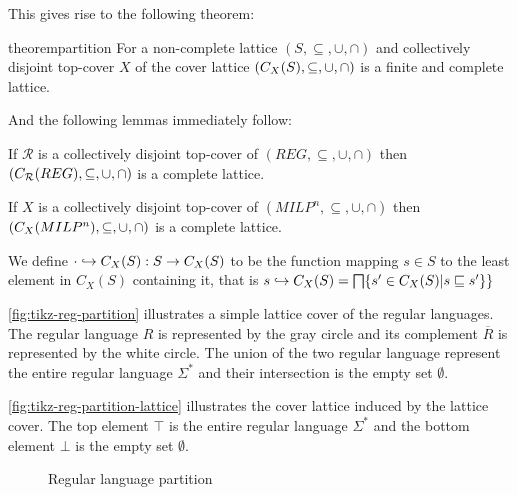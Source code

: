 This gives rise to the following theorem:

\begin{restatable}{theorem}{partition}\label{thm:partition}
    For a non-complete lattice $(S, \subseteq, \cup, \cap)$ and collectively disjoint top-cover $X$ of the cover lattice $(C_{X}(S), \subseteq, \cup, \cap)$ is a finite and complete lattice.
\end{restatable}

And the following lemmas immediately follow:

\begin{lemma}
    If $\mathcal{R}$ is a collectively disjoint top-cover of $(REG, \subseteq, \cup, \cap)$ then $(C_{\mathcal{R}}(REG), \subseteq, \cup, \cap)$ is a complete lattice.
\end{lemma}

\begin{lemma}
    If $X$ is a collectively disjoint top-cover of $(MILP^n, \subseteq, \cup, \cap)$ then $(C_{X}(MILP^n), \subseteq, \cup, \cap)$ is a complete lattice.
\end{lemma}

\begin{definition}
    We define $\cdot \hookrightarrow C_X(S):S\rightarrow C_X(S)$ to be the function mapping $s\in S$ to the least element in $C_X(S)$ containing it, that is $s \intoset C_X(S)=\bigsqcap\{s'\in C_X(S)|s\sqsubseteq s'\}\}$
\end{definition}

\begin{example}
    \autoref{fig:tikz-reg-partition} illustrates a simple lattice cover of the regular languages. The regular language $R$ is represented by the gray circle and its complement $\overline{R}$ is represented by the white circle. The union of the two regular language represent the entire regular language $\Sigma^*$ and their intersection is the empty set $\emptyset$.

    \autoref{fig:tikz-reg-partition-lattice} illustrates the cover lattice induced by the lattice cover. The top element $\top$ is the entire regular language $\Sigma^*$ and the bottom element $\bot$ is the empty set $\emptyset$.
\end{example}

\begin{figure}
    \center
    \caption{Regular language partition}
    \label{fig:tikz-reg-partition}
\end{figure}


